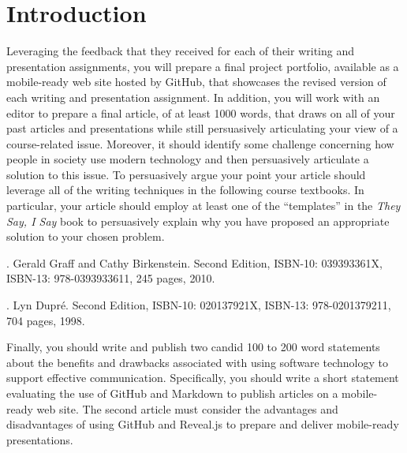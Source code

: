 

\usepackage[compact]{titlesec}




\vspace*{-.2in}
\section*{Introduction}

Leveraging the feedback that they received for each of their writing and presentation assignments, you will prepare a
final project portfolio, available as a mobile-ready web site hosted by GitHub, that showcases the revised version of
each writing and presentation assignment. In addition, you will work with an editor to prepare a final article, of at
least 1000 words, that draws on all of your past articles and presentations while still persuasively articulating your
view of a course-related issue. Moreover, it should identify some challenge concerning how people in society use modern
technology and then persuasively articulate a solution to this issue. To persuasively argue your point your article
should leverage all of the writing techniques in the following course textbooks. In particular, your article should
employ at least one of the ``templates'' in the {\em They Say, I Say} book to persuasively explain why you have proposed
an appropriate solution to your chosen problem.

. Gerald Graff and Cathy Birkenstein. Second Edition,
ISBN-10: 039393361X, ISBN-13: 978-0393933611, 245 pages, 2010.

. Lyn Dupr\'e. Second Edition, ISBN-10: 020137921X,
ISBN-13: 978-0201379211, 704 pages, 1998.

Finally, you should write and publish two candid 100 to 200 word statements about the benefits and drawbacks associated
with using software technology to support effective communication. Specifically, you should write a short statement
evaluating the use of GitHub and Markdown to publish articles on a mobile-ready web site. The second article must
consider the advantages and disadvantages of using GitHub and Reveal.js to prepare and deliver mobile-ready
presentations.


